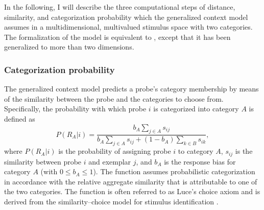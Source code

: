 \documentclass[a4paper,man,natbib]{apa6}
\begin{document}
In the following, I will describe the three computational steps of distance, similarity, and categorization probability which the generalized context model assumes in a multidimensional, multivalued stimulus space with two categories. The formalization of the model is equivalent to \cite[][pp.281--282]{nosofsky1989further}, except that it has been generalized to more than two dimensions. 

\subsubsection{Categorization probability}
The generalized context model \citep{nosofsky1989further} predicts a probe's category membership by means of the similarity between the probe and the categories to choose from. Specifically, the probability with which probe $i$ is categorized into category $A$ is defined as 
\begin{equation}
P(R_{A}|i) = \frac{b_{A}\sum\limits_{j \in A} s_{ij}}{b_{A}\sum\limits_{j \in A} s_{ij} + (1 - b_{A})\sum\limits_{k \in B} s_{ik}},
\label{eq:probability}
\end{equation}
where $P(R_{A}|i)$ is the probability of assigning probe $i$ to category $A$, $s_{ij}$ is the similarity between probe $i$ and exemplar $j$, and $b_{A}$ is the response bias for category $A$ (with $0 \leq b_{A} \leq 1$). The function assumes probabilistic categorization in accordance with the relative aggregate similarity that is attributable to one of the two categories. The function is often referred to as Luce's choice axiom \citep{luce1959individual} and is derived from the similarity--choice model for stimulus identification \citep{luce1963detection, shepard1957stimulus}. 
\end{document}
